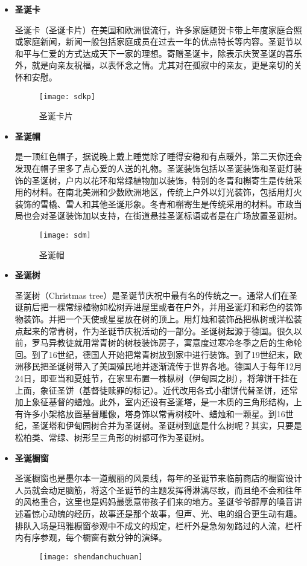 \begin{itemize}
\item \textbf{圣诞卡}

 圣诞卡（圣诞卡片）在美国和欧洲很流行，许多家庭随贺卡带上年度家庭合照或家庭新闻，新闻一般包括家庭成员在过去一年的优点特长等内容。圣诞节以和平与仁爱的方式达成天下一家的理想。寄赠圣诞卡，除表示庆贺圣诞的喜乐外，就是向亲友祝福，以表怀念之情。尤其对在孤寂中的亲友，更是亲切的关怀和安慰。

 \begin{figure}[htb]
    \centering
    \texttt{[image: sdkp]}
    \caption{圣诞卡片}
 \end{figure}

\item \textbf{圣诞帽}

 是一顶红色帽子，据说晚上戴上睡觉除了睡得安稳和有点暖外，第二天你还会发现在帽子里多了点心爱的人送的礼物。圣诞装饰包括以圣诞装饰和圣诞灯装饰的圣诞树，户内以花环和常绿植物加以装饰，特别的冬青和槲寄生是传统采用的材料。在南北美洲和少数欧洲地区，传统上户外以灯光装饰，包括用灯火装饰的雪橇、雪人和其他圣诞形象。冬青和槲寄生是传统采用的材料。市政当局也会对圣诞装饰加以支持，在街道悬挂圣诞标语或者是在广场放置圣诞树。
 \begin{figure}[htb]
     \centering
     \texttt{[image: sdm]}
     \caption{圣诞帽}
 \end{figure}

\item \textbf{圣诞树}

 圣诞树（Christmas tree）是圣诞节庆祝中最有名的传统之一。通常人们在圣诞前后把一棵常绿植物如松树弄进屋里或者在户外，并用圣诞灯和彩色的装饰物装饰。并把一个天使或星星放在树的顶上。用灯烛和装饰品把枞树或洋松装点起来的常青树，作为圣诞节庆祝活动的一部分。圣诞树起源于德国。很久以前，罗马异教徒就用常青树的树枝装饰房子，寓意度过寒冷冬季之后的生命轮回。到了16世纪，德国人开始把常青树放到家中进行装饰。到了19世纪末，欧洲移民把圣诞树带入了美国殖民地并逐渐流传于世界各地。德国人于每年12月24日，即亚当和夏娃节，在家里布置一株枞树（伊甸园之树），将薄饼干挂在上面，象征圣饼（基督徒赎罪的标记）。近代改用各式小甜饼代替圣饼，还常加上象征基督的蜡烛。此外，室内还设有圣诞塔，是一木质的三角形结构，上有许多小架格放置基督雕像，塔身饰以常青树枝叶、蜡烛和一颗星。到16世纪，圣诞塔和伊甸园树合并为圣诞树。圣诞树到底是什么树呢？其实，只要是松柏类、常绿、树形呈三角形的树都可作为圣诞树。

\item \textbf{圣诞橱窗}

 圣诞橱窗也是墨尔本一道靓丽的风景线，每年的圣诞节来临前商店的橱窗设计人员就会动足脑筋，将这个圣诞节的主题发挥得淋漓尽致，而且绝不会和往年的风格重合，这里也是妈妈最愿意带孩子们来的地方。圣诞爷爷醇厚的嗓音讲述着惊心动魄的经历，故事还是那个故事，但声、光、电的组合更生动有趣。排队入场是玛雅橱窗参观中不成文的规定，栏杆外是急匆匆路过的人流，栏杆内有序参观，每个橱窗有数分钟的演绎。
\begin{figure}[htb]
    \centering
    \texttt{[image: shendanchuchuan]}


\end{figure}
\end{itemize}

